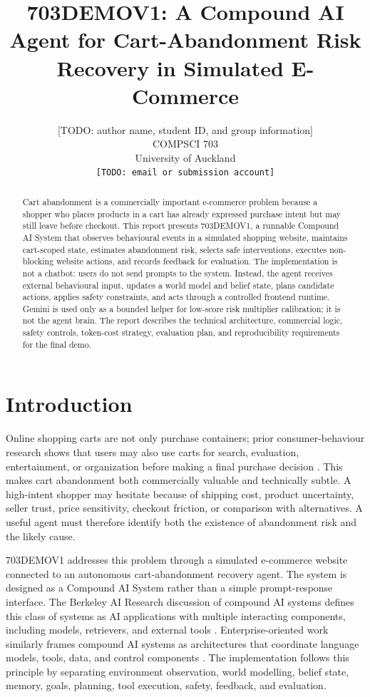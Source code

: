 \documentclass{article}
\title{703DEMOV1: A Compound AI Agent for Cart-Abandonment Risk Recovery in Simulated E-Commerce}
\author{
  [TODO: author name, student ID, and group information]\\
  COMPSCI 703\\
  University of Auckland\\
  \texttt{[TODO: email or submission account]}
}
\begin{document}
\maketitle

\begin{abstract}
Cart abandonment is a commercially important e-commerce problem because a shopper who places products in a cart has already expressed purchase intent but may still leave before checkout. This report presents 703DEMOV1, a runnable Compound AI System that observes behavioural events in a simulated shopping website, maintains cart-scoped state, estimates abandonment risk, selects safe interventions, executes non-blocking website actions, and records feedback for evaluation. The implementation is not a chatbot: users do not send prompts to the system. Instead, the agent receives external behavioural input, updates a world model and belief state, plans candidate actions, applies safety constraints, and acts through a controlled frontend runtime. Gemini is used only as a bounded helper for low-score risk multiplier calibration; it is not the agent brain. The report describes the technical architecture, commercial logic, safety controls, token-cost strategy, evaluation plan, and reproducibility requirements for the final demo.
\end{abstract}

\section{Introduction}
Online shopping carts are not only purchase containers; prior consumer-behaviour research shows that users may also use carts for search, evaluation, entertainment, or organization before making a final purchase decision \cite{kukar2010cart}. This makes cart abandonment both commercially valuable and technically subtle. A high-intent shopper may hesitate because of shipping cost, product uncertainty, seller trust, price sensitivity, checkout friction, or comparison with alternatives. A useful agent must therefore identify both the existence of abandonment risk and the likely cause.

703DEMOV1 addresses this problem through a simulated e-commerce website connected to an autonomous cart-abandonment recovery agent. The system is designed as a Compound AI System rather than a simple prompt-response interface. The Berkeley AI Research discussion of compound AI systems defines this class of systems as AI applications with multiple interacting components, including models, retrievers, and external tools \cite{zaharia2024compound}. Enterprise-oriented work similarly frames compound AI systems as architectures that coordinate language models, tools, data, and control components \cite{kandogan2024blueprint}. The implementation follows this principle by separating environment observation, world modelling, belief state, memory, goals, planning, tool execution, safety, feedback, and evaluation.
\end{document}

